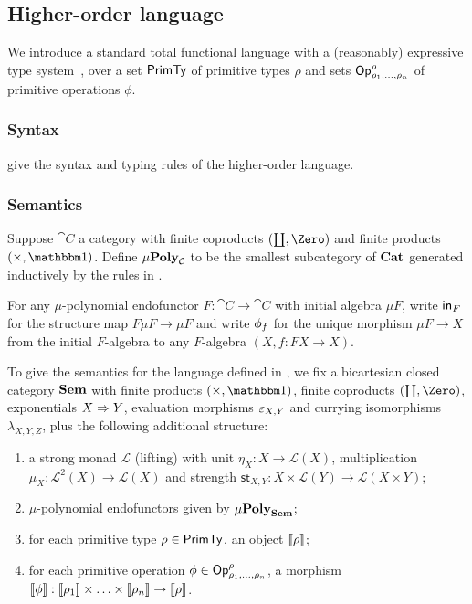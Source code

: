 \subsection{Higher-order language}

We introduce a standard total functional language with a (reasonably) expressive type
system~\cite{crole94,pitts01,santocanale02}, over a set $\mathsf{PrimTy}$ of primitive types $\rho$ and sets
$\mathsf{Op}^\rho_{\rho_1,\ldots,\rho_n}$ of primitive operations $\phi$.

\subsubsection{Syntax}
\label{sec:language:syntax}




 give the syntax and typing rules of the higher-order language.

\subsubsection{Semantics}
\label{sec:language:semantics}




\begin{definition}[$\mu$-polynomial]
Suppose $\cat{C}$ a category with finite coproducts $(\coprod, \Zero)$ and finite products $(\times, \One)$.
Define $\mu\mathbf{Poly}_{\mathcal{C}}$ to be the smallest subcategory of $\mathbf{Cat}$ generated inductively by the rules in
.
\end{definition}

For any $\mu$-polynomial endofunctor $F: \cat{C} \to \cat{C}$ with initial algebra $\mu F$, write $\mathsf{in}_F$
for the structure map $F\mu F \to \mu F$ and write $\phi_f$ for the unique morphism $\mu F \to X$ from the
initial $F$-algebra to any $F$-algebra $(X, f: FX \to X)$.

To give the semantics for the language defined in , we fix a bicartesian closed
category $\mathbf{Sem}$ with finite products $(\times, \One)$, finite coproducts $(\coprod, \Zero)$, exponentials
$X \Rightarrow Y$, evaluation morphisms $\varepsilon_{X,Y}$ and currying isomorphisms $\lambda_{X,Y,Z}$, plus the
following additional structure:
\begin{enumerate}
\item a strong monad $\mathcal{L}$ (lifting) with unit $\eta_X: X \to \mathcal{L}(X)$, multiplication $\mu_X:
\mathcal{L}^2(X) \to \mathcal{L}(X)$ and strength $\mathsf{st}_{X,Y}: X \times \mathcal{L}(Y) \to
\mathcal{L}(X \times Y)$;
\item $\mu$-polynomial endofunctors given by $\mu\mathbf{Poly}_{\mathbf{Sem}}$;
\item for each primitive type $\rho \in \mathsf{PrimTy}$, an object $\llbracket \rho \rrbracket$;
\item for each primitive operation $\phi \in \mathsf{Op}^\rho_{\rho_1,\ldots,\rho_n}$, a morphism $\llbracket \phi \rrbracket:
\llbracket \rho_1 \rrbracket \times \ldots \times \llbracket \rho_n \rrbracket \to \llbracket \rho \rrbracket$.
\end{enumerate}

